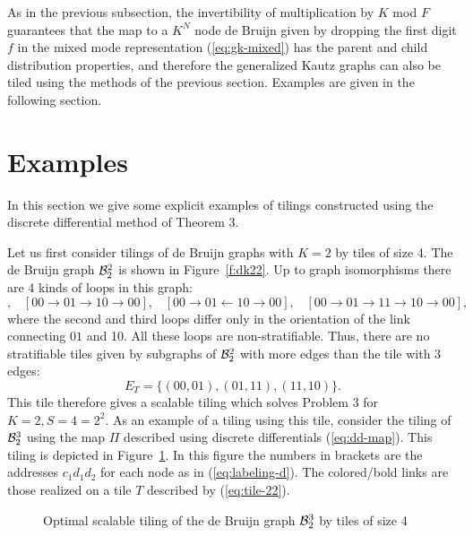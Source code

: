 \documentclass[12pt]{article}
\begin{document}
As in the previous subsection, the invertibility of multiplication by
$K$ mod $F$ guarantees that the map to a $K^N$ node de Bruijn given by
dropping the first digit $f$ in the mixed mode representation
(\ref{eq:gk-mixed}) has the parent and child distribution properties,
and therefore the generalized Kautz graphs can also be tiled using the
methods of the previous section.  Examples are given in the following
section.

\section{Examples}
\label{sec:examples}

In this section we give some explicit examples of tilings constructed
using the discrete differential method of Theorem 3.


Let us first consider tilings of
de Bruijn graphs with $K = 2$ by tiles of size 4.  The de Bruijn graph
${\cal B}_2^2$ is shown in  Figure~\ref{f:dk22}.  Up to graph
isomorphisms there are  4 kinds of loops in this graph: 
\begin{equation}
[00 \rightarrow 00], \;\;\;
[00 \rightarrow 01 \rightarrow 10 \rightarrow 00], \;\;\;
[00 \rightarrow 01 \leftarrow 10 \rightarrow 00], \;\;\;
[00 \rightarrow 01 \rightarrow 11 \rightarrow 10 \rightarrow 00],
\end{equation}
where the second and third
loops differ only in the orientation of the link connecting
$01$ and 10.
All these loops are non-stratifiable.  Thus, there are no stratifiable
tiles given by subgraphs of ${\cal B}_2^2$ with more  edges than the
tile with 3 edges:
\begin{equation}
E_T =\{(00, 01), (01, 11), (11, 10)\}.
\label{eq:tile-22}
\end{equation}
This tile therefore gives a scalable tiling which solves Problem 3 for
$K = 2, S = 4 = 2^2$.  As an example of a tiling using this tile,
consider the tiling of ${\cal B}_2^3$ using the map $\Pi$ described
using discrete differentials (\ref{eq:dd-map}).  This tiling is
depicted in Figure~\ref{f:d23}.  In this figure the numbers in
brackets are the addresses $c_1 d_1 d_2$ for each node as in
(\ref{eq:labeling-d}).  The colored/bold links are those realized on
a tile $T$ described by (\ref{eq:tile-22}).
\begin{figure}
\begin{center}
\end{center}
\caption[x]{\footnotesize Optimal scalable
tiling of the de Bruijn graph
${\cal B}_2^3$ by tiles of size 4}
\label{f:d23}
\end{figure}
\end{document}
